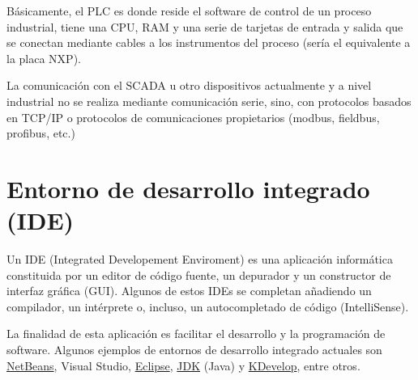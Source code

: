 
Básicamente, el PLC es donde reside el software de control de un proceso industrial, tiene una CPU, RAM y una serie de tarjetas de entrada y salida que se conectan mediante cables a los instrumentos del proceso (sería el equivalente a la placa NXP).

La comunicación con el SCADA u otro dispositivos actualmente y a nivel industrial no se realiza mediante comunicación serie, sino, con protocolos basados en TCP/IP o protocolos de comunicaciones propietarios (modbus, fieldbus, profibus, etc.)

\section{Entorno de desarrollo integrado (IDE)}

Un IDE (Integrated Developement Enviroment) es una aplicación informática constituida por un editor de código fuente, un depurador y un constructor de interfaz gráfica (GUI). Algunos de estos IDEs se completan añadiendo un compilador, un intérprete o, incluso, un autocompletado de código (IntelliSense).

La finalidad de esta aplicación es facilitar el desarrollo y la programación de software. Algunos ejemplos de entornos de desarrollo integrado actuales son \href{https://netbeans.org/}{NetBeans}, Visual Studio, \href{https://www.eclipse.org/}{Eclipse}, \href{https://www.oracle.com/technetwork/java/javase/downloads/jdk8-downloads-2133151.html}{JDK} (Java) y \href{https://www.kdevelop.org/}{KDevelop}, entre otros.